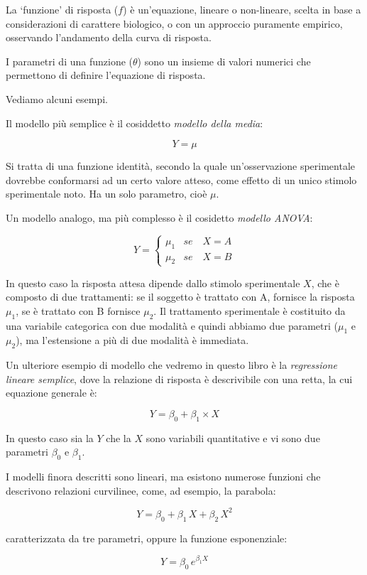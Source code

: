 \documentclass[a4paper,12pt,oneside]{book}
\begin{document}
La `funzione' di risposta (\(f\)) è un'equazione, lineare o non-lineare, scelta in base a considerazioni di carattere biologico, o con un approccio puramente empirico, osservando l'andamento della curva di risposta.

I parametri di una funzione (\(\theta\)) sono un insieme di valori numerici che permettono di definire l'equazione di risposta.

Vediamo alcuni esempi.

Il modello più semplice è il cosiddetto \emph{modello della media}:

\[ Y = \mu \]

Si tratta di una funzione identità, secondo la quale un'osservazione sperimentale dovrebbe conformarsi ad un certo valore atteso, come effetto di un unico stimolo sperimentale noto. Ha un solo parametro, cioè \(\mu\).

Un modello analogo, ma più complesso è il cosidetto \emph{modello ANOVA}:

\[
Y = \left\{ {\begin{array}{ll}
\mu_1 & se \quad X = A \\
\mu_2 & se \quad X = B
\end{array}} \right.
\]

In questo caso la risposta attesa dipende dallo stimolo sperimentale \(X\), che è composto di due trattamenti: se il soggetto è trattato con A, fornisce la risposta \(\mu_1\), se è trattato con B fornisce \(\mu_2\). Il trattamento sperimentale è costituito da una variabile categorica con due modalità e quindi abbiamo due parametri (\(\mu_1\) e \(\mu_2\)), ma l'estensione a più di due modalità è immediata.

Un ulteriore esempio di modello che vedremo in questo libro è la \emph{regressione lineare semplice}, dove la relazione di risposta è descrivibile con una retta, la cui equazione generale è:

\[ Y = \beta_0 + \beta_1 \times X \]

In questo caso sia la \(Y\) che la \(X\) sono variabili quantitative e vi sono due parametri \(\beta_0\) e \(\beta_1\).

I modelli finora descritti sono lineari, ma esistono numerose funzioni che descrivono relazioni curvilinee, come, ad esempio, la parabola:

\[ Y = \beta_0 + \beta_1 \, X + \beta_2 \, X^2\]

caratterizzata da tre parametri, oppure la funzione esponenziale:

\[ Y = \beta_0 \, e^{\beta_1 X} \]
\end{document}
